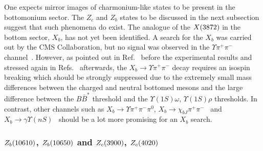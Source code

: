 One expects mirror images of charmonium-like states to be present in the
bottomonium sector. The $Z_c$ and $Z_b$ states to be discussed in the next
subsection suggest that such phenomena do exist. The analogue of the $X(3872)$ in the
bottom sector, $X_b$, has not yet been identified.
A search for the $X_b$ was carried out by the CMS Collaboration, but no signal
was observed in  the $\Upsilon \pi^+\pi^-$ channel~\cite{Chatrchyan:2013mea}.
However, as pointed out in Ref.~\cite{Guo:2013sya} before the experimental
results and stressed again in Refs.~\cite{Guo:2014sca,Karliner:2014lta}
afterwards, the $X_b\to \Upsilon \pi^+\pi^-$ decay requires an isospin breaking
which should be strongly suppressed due to the extremely small mass differences
between the charged and neutral bottomed mesons and the large difference between
the $B\bar B^*$ threshold and the $\Upsilon(1S)\omega$, $\Upsilon(1S)\rho$
thresholds.
In contrast, other channels such as $X_b\to \Upsilon\pi^+\pi^-\pi^0$, $X_b\to
\chi_{bJ}\pi^+\pi^-$~\cite{Guo:2013sya,Guo:2014sca,Karliner:2014lta} and $X_b\to
\gamma\Upsilon(nS)$~\cite{Li:2014uia} should be a lot more promising for an
$X_b$ search.



\subsubsection{$Z_b(10610)$, $Z_b(10650)$ and $Z_c(3900)$, $Z_c(4020)$}
\label{sec:zc}


